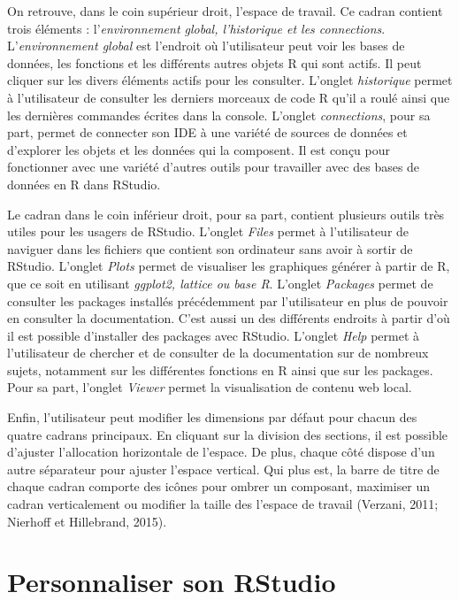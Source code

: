 \documentclass[
  letterpaper,
]{scrbook}
\begin{document}
On retrouve, dans le coin supérieur droit, l'espace de travail. Ce
cadran contient trois éléments : l'\emph{environnement global,
l'historique et les connections}. L'\emph{environnement global} est
l'endroit où l'utilisateur peut voir les bases de données, les fonctions
et les différents autres objets R qui sont actifs. Il peut cliquer sur
les divers éléments actifs pour les consulter. L'onglet
\emph{historique} permet à l'utilisateur de consulter les derniers
morceaux de code R qu'il a roulé ainsi que les dernières commandes
écrites dans la console. L'onglet \emph{connections}, pour sa part,
permet de connecter son IDE à une variété de sources de données et
d'explorer les objets et les données qui la composent. Il est conçu pour
fonctionner avec une variété d'autres outils pour travailler avec des
bases de données en R dans RStudio.

Le cadran dans le coin inférieur droit, pour sa part, contient plusieurs
outils très utiles pour les usagers de RStudio. L'onglet \emph{Files}
permet à l'utilisateur de naviguer dans les fichiers que contient son
ordinateur sans avoir à sortir de RStudio. L'onglet \emph{Plots} permet
de visualiser les graphiques générer à partir de R, que ce soit en
utilisant \emph{ggplot2, lattice ou base R}. L'onglet \emph{Packages}
permet de consulter les packages installés précédemment par
l'utilisateur en plus de pouvoir en consulter la documentation. C'est
aussi un des différents endroits à partir d'où il est possible
d'installer des packages avec RStudio. L'onglet \emph{Help} permet à
l'utilisateur de chercher et de consulter de la documentation sur de
nombreux sujets, notamment sur les différentes fonctions en R ainsi que
sur les packages. Pour sa part, l'onglet \emph{Viewer} permet la
visualisation de contenu web local.

Enfin, l'utilisateur peut modifier les dimensions par défaut pour chacun
des quatre cadrans principaux. En cliquant sur la division des sections,
il est possible d'ajuster l'allocation horizontale de l'espace. De plus,
chaque côté dispose d'un autre séparateur pour ajuster l'espace
vertical. Qui plus est, la barre de titre de chaque cadran comporte des
icônes pour ombrer un composant, maximiser un cadran verticalement ou
modifier la taille des l'espace de travail (Verzani, 2011; Nierhoff et
Hillebrand, 2015).

\hypertarget{personnaliser-son-rstudio}{%
\section{Personnaliser son RStudio}\label{personnaliser-son-rstudio}}
\end{document}
